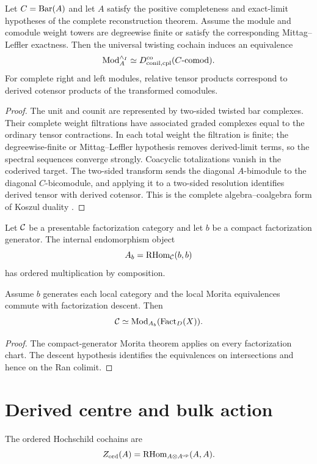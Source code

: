 \begin{theorem}
Let $C=\operatorname{Bar}(A)$ and let $A$ satisfy the positive completeness and exact-limit hypotheses of the complete reconstruction theorem. Assume the module and comodule weight towers are degreewise finite or satisfy the corresponding Mittag--Leffler exactness. Then the universal twisting cochain induces an equivalence
\[
 \operatorname{Mod}_A^{\wedge_I}
 \simeq
 D^{\mathrm{co}}_{\mathrm{conil,cpl}}(C\text{-}\mathrm{comod}).
\]
For complete right and left modules, relative tensor products correspond to derived cotensor products of the transformed comodules.
\end{theorem}
\begin{proof}
The unit and counit are represented by two-sided twisted bar complexes. Their complete weight filtrations have associated graded complexes equal to the ordinary tensor contractions. In each total weight the filtration is finite; the degreewise-finite or Mittag--Leffler hypothesis removes derived-limit terms, so the spectral sequences converge strongly. Coacyclic totalizations vanish in the coderived target. The two-sided transform sends the diagonal $A$-bimodule to the diagonal $C$-bicomodule, and applying it to a two-sided resolution identifies derived tensor with derived cotensor. This is the complete algebra--coalgebra form of Koszul duality \cite{Positselski,LurieHA}.
\end{proof}

Let $\mathcal C$ be a presentable factorization category and let $b$ be a compact factorization generator. The internal endomorphism object
\[
 A_b=\operatorname{RHom}_{\mathcal C}(b,b)
\]
has ordered multiplication by composition.

\begin{theorem}
Assume $b$ generates each local category and the local Morita equivalences commute with factorization descent. Then
\[
 \mathcal C\simeq \operatorname{Mod}_{A_b}(\operatorname{Fact}_D(X)).
\]
\end{theorem}
\begin{proof}
The compact-generator Morita theorem applies on every factorization chart. The descent hypothesis identifies the equivalences on intersections and hence on the Ran colimit.
\end{proof}

\chapter{Derived centre and bulk action}
The ordered Hochschild cochains are
\[
 Z_{\mathrm{ord}}(A)=\operatorname{RHom}_{A\otimes A^{\mathrm{op}}}(A,A).
\]

